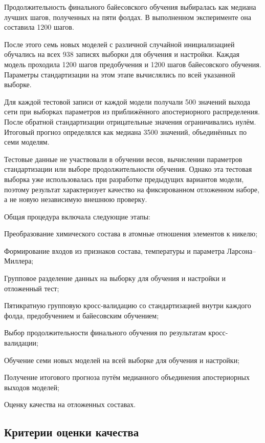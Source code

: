 Продолжительность финального байесовского обучения
выбиралась как медиана лучших шагов,
полученных на пяти фолдах.
В выполненном эксперименте она составила
1200 шагов.

После этого семь новых моделей с различной
случайной инициализацией обучались на всех
938 записях выборки для обучения и настройки.
Каждая модель проходила 1200 шагов предобучения
и 1200 шагов байесовского обучения.
Параметры стандартизации на этом этапе
вычислялись по всей указанной выборке.

Для каждой тестовой записи от каждой модели
получали 500 значений выхода сети при выборках
параметров из приближённого апостериорного
распределения. После обратной стандартизации
отрицательные значения ограничивались нулём.
Итоговый прогноз определялся как медиана
3500 значений, объединённых по семи моделям.

Тестовые данные не участвовали в обучении весов,
вычислении параметров стандартизации
или выборе продолжительности обучения.
Однако эта тестовая выборка уже использовалась
при разработке предыдущих вариантов модели,
поэтому результат характеризует качество
на фиксированном отложенном наборе,
а не новую независимую внешнюю проверку.

Общая процедура включала следующие этапы:

\begin{enumeratePaper}
    \item Преобразование химического состава
    в атомные отношения элементов к никелю;
    \item Формирование входов из признаков состава,
    температуры и параметра Ларсона--Миллера;
    \item Групповое разделение данных на выборку
    для обучения и настройки и отложенный тест;
    \item Пятикратную групповую кросс-валидацию
    со стандартизацией внутри каждого фолда,
    предобучением и байесовским обучением;
    \item Выбор продолжительности финального
    обучения по результатам кросс-валидации;
    \item Обучение семи новых моделей
    на всей выборке для обучения и настройки;
    \item Получение итогового прогноза
    путём медианного объединения
    апостериорных выходов моделей;
    \item Оценку качества на отложенных составах.
\end{enumeratePaper}

\subsection{Критерии оценки качества}

